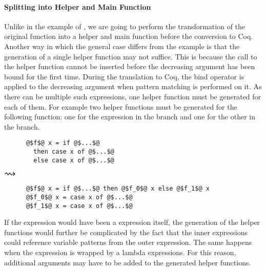 \paragraph{Splitting into Helper and Main Function}
Unlike in the example of , we are going to perform the transformation of the original function into a helper and main function before the conversion to Coq.
Another way in which the general case differs from the example is that the generation of a single helper function may not suffice.
This is because the call to the helper function cannot be inserted before the decreasing argument has been bound for the first time.
During the translation to Coq, the bind operator is applied to the decreasing argument when pattern matching is performed on it.
As there can be multiple such  expressions, one helper function must be generated for each of them.
For example two helper functions must be generated for the following function: one for the  expression in the  branch and one for the other in the  branch.

\begin{center}
  \begin{minipage}[t]{0.3\textwidth}
    \begin{verbatim}
      @$f$@ x = if @$...$@
        then case x of @$...$@
        else case x of @$...$@
    \end{verbatim}
  \end{minipage}
  \begin{minipage}[c]{0.1\textwidth}
    $\mathlarger{\mathlarger{\mathlarger{\rightsquigarrow}}}$
  \end{minipage}
  \begin{minipage}[t]{0.35\textwidth}
    \begin{verbatim}
      @$f$@ x = if @$...$@ then @$f_0$@ x else @$f_1$@ x
      @$f_0$@ x = case x of @$...$@
      @$f_1$@ x = case x of @$...$@
    \end{verbatim}
  \end{minipage}
\end{center}

If the  expression would have been a  expression itself, the generation of the helper functions would further be complicated by the fact that the inner  expressions could reference variable patterns from the outer  expression.
The same happens when the  expression is wrapped by a lambda expressions.
For this reason, additional arguments may have to be added to the generated helper functions.


